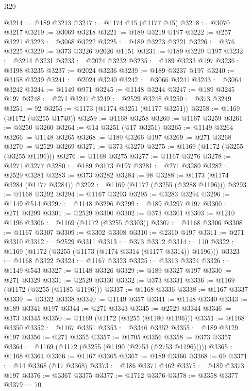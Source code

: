 \begin{lexlean}{R20}
\begin{coremodule}
@3214 := @189 @3213
@3217 := @1174 @15 (@1177 @15)
@3218 := @3070 @3217
@3219 := @3069 @3218
@3221 := @189 @3219 @197
@3222 := @257 @3221
@3223 := @3068 @3222
@3225 := @189 @3223 @3221
@3226 := @376 @3225
@3229 := @373 @3226 @2026 @1151
@3231 := @189 @3229 @197
@3232 := @3214 @3231
@3233 := @2024 @3232
@3235 := @189 @3233 @197
@3236 := @3198 @3235
@3237 := @2024 @3236
@3239 := @189 @3237 @197
@3240 := @3158 @3239
@3241 := @2024 @3240
@3242 := @3066 @3241
@3243 := @3064 @3242
@3244 := @1149 @971
@3245 := @1148 @3244
@3247 := @189 @3245 @197
@3248 := @271 @3247
@3249 := @2529 @3248
@3250 := @373 @3249
@3251 := 92
@3255 := @1173 (@1174 @3251 (@1177 @3251))
@3258 := @1169 (@1172 (@3255 @1740))
@3259 := @1168 @3258
@3260 := @1167 @3259
@3261 := @3250 @3260
@3264 := @14 @3251 (@17 @3251)
@3265 := @1149 @3264
@3266 := @1148 @3265
@3268 := @189 @3266 @197
@3269 := @271 @3268
@3270 := @2529 @3269
@3271 := @373 @3270
@3275 := @1169 (@1172 (@3255 (@3255 @1196)))
@3276 := @1168 @3275
@3277 := @1167 @3276
@3278 := @3271 @3277
@3280 := @189 @3173 @197
@3281 := @271 @3280
@3282 := @2529 @3281
@3283 := @373 @3282
@3284 := 98
@3288 := @1173 (@1174 @3284 (@1177 @3284))
@3292 := @1169 (@1172 (@3255 (@3288 @1196)))
@3293 := @1168 @3292
@3294 := @1167 @3293
@3295 := @3283 @3294
@3296 := @1149 @514
@3297 := @1148 @3296
@3299 := @189 @3297 @197
@3300 := @271 @3299
@3301 := @2529 @3300
@3302 := @373 @3301
@3303 := @1210 @1196
@3306 := @1169 (@1172 (@3255 @3303))
@3307 := @1168 @3306
@3308 := @1167 @3307
@3309 := @3302 @3308
@3310 := @2310 @197
@3311 := @271 @3310
@3312 := @2529 @3311
@3313 := @373 @3312
@3314 := 110
@3322 := @1169 (@1172 (@3255 (@1173 (@1174 @3314 (@1177 @3314)) @1196)))
@3323 := @1168 @3322
@3324 := @1167 @3323
@3325 := @3313 @3324
@3326 := @1149 @543
@3327 := @1148 @3326
@3329 := @189 @3327 @197
@3330 := @271 @3329
@3331 := @2529 @3330
@3332 := @373 @3331
@3336 := @1169 (@1172 (@3255 (@1185 @1196)))
@3337 := @1168 @3336
@3338 := @1167 @3337
@3339 := @3332 @3338
@3340 := @1149 @357
@3341 := @1148 @3340
@3343 := @189 @3341 @197
@3344 := @271 @3343
@3345 := @2529 @3344
@3346 := @373 @3345
@3350 := @1169 (@1172 (@3255 (@1180 @1196)))
@3351 := @1168 @3350
@3352 := @1167 @3351
@3353 := @3346 @3352
@3355 := @189 @3129 @197
@3356 := @271 @3355
@3357 := @1705 @3356
@3358 := @373 @3357
@3364 := @1169 (@1172 (@3255 (@1190 (@2753 (@2753 @1196)))))
@3365 := @1168 @3364
@3366 := @1167 @3365
@3367 := @189 @3366
@3368 := 69
@3371 := @14 @3368 (@17 @3368)
@3373 := @186 @3371 @462
@3375 := @189 @3373 @197
@3376 := @3367 @3375
@3377 := @1712 @3376
@3378 := @3358 @3377
@3379 := 70

\end{coremodule}
\end{lexlean}
